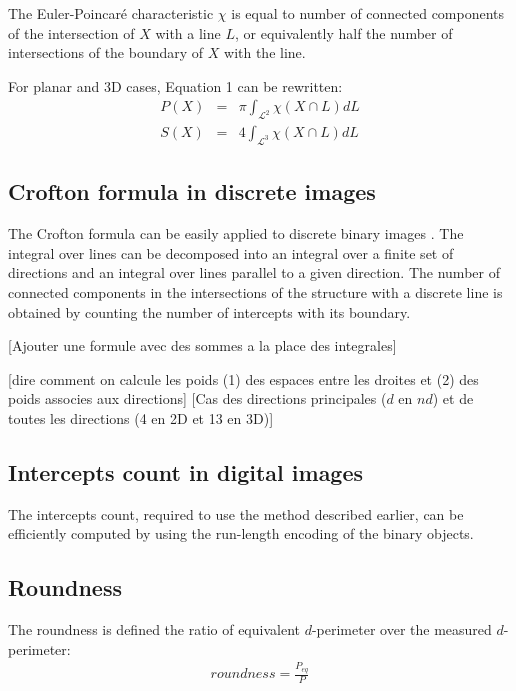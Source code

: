 \documentclass{InsightArticle}
\begin{document}
The Euler-Poincar\'e characteristic $\chi$ is equal to number of connected components
of the intersection of $X$ with a line $L$, or equivalently half the number of intersections
of the boundary of $X$ with the line.

For planar and 3D cases, Equation 1 can be rewritten:
\begin{eqnarray}
P(X) & = & \pi \int_{\mathcal{L}^2} \chi \left( X \cap L \right) dL \\
S(X) & = &  4  \int_{\mathcal{L}^3} \chi \left( X \cap L \right) dL
\end{eqnarray}

\subsection{Crofton formula in discrete images}

The Crofton formula can be easily applied to discrete binary images \cite{Lang2001, Legland2007}. 
The integral over lines can be decomposed into an integral over a finite set of directions
and an integral over lines parallel to a given direction.
The number of connected components in the intersections of the structure with a discrete line
is obtained by counting the number of intercepts with its boundary.

[Ajouter une formule avec des sommes a la place des integrales]

[dire comment on calcule les poids (1) des espaces entre les droites et (2) des poids associes aux directions]
[Cas des directions principales ($d$ en $nd$) et de toutes les directions (4 en 2D et 13 en 3D)]

\subsection{Intercepts count in digital images}

The intercepts count, required to use the method described earlier, can be efficiently computed by using the run-length
encoding of the binary objects.

\subsection{Roundness}

The roundness is defined the ratio of equivalent $d$-perimeter over the measured $d$-perimeter:
\begin{eqnarray}
roundness = \frac{P_{eq}}{P}
\end{eqnarray}
\end{document}
